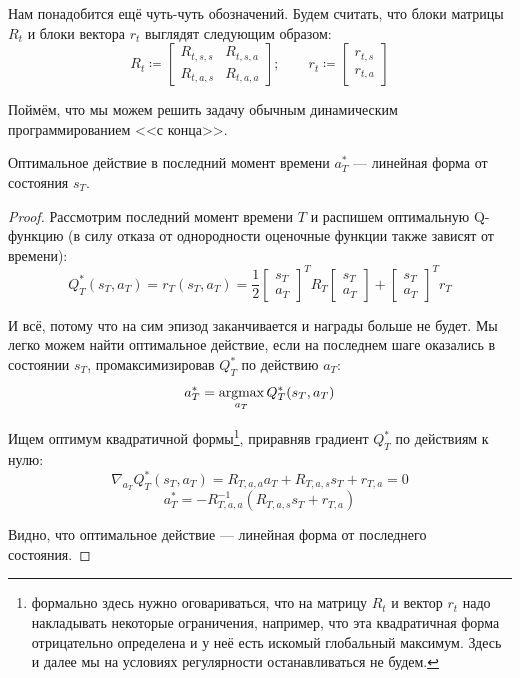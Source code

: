 Нам понадобится ещё чуть-чуть обозначений. Будем считать, что блоки матрицы $R_t$ и блоки вектора $r_t$ выглядят следующим образом:
$$R_t \coloneqq \begin{bmatrix} R_{t, s, s} & R_{t, s, a} \\ R_{t, a, s} & R_{t, a, a} \end{bmatrix}; \qquad r_t \coloneqq \begin{bmatrix} r_{t, s} \\ r_{t, a} \end{bmatrix}$$

Поймём, что мы можем решить задачу обычным динамическим программированием <<с конца>>.
\begin{theorem}
Оптимальное действие в последний момент времени $a_T^*$ --- линейная форма от состояния $s_T$.
\begin{proof}
Рассмотрим последний момент времени $T$ и распишем оптимальную Q-функцию (в силу отказа от однородности оценочные функции также зависят от времени):
$$Q^*_T(s_T, a_T) = r_T(s_T, a_T) = \frac{1}{2} \begin{bmatrix} s_T \\ a_T \end{bmatrix}^T R_T \begin{bmatrix} s_T \\ a_T \end{bmatrix} + \begin{bmatrix} s_T \\ a_T \end{bmatrix}^T r_T$$

И всё, потому что на сим эпизод заканчивается и награды больше не будет. Мы легко можем найти оптимальное действие, если на последнем шаге оказались в состоянии $s_T$, промаксимизировав $Q^*_T$ по действию $a_T$:
$$a^*_T = \mathop{\mathrm{argmax}}_{a_T} Q^*_T(s_T, a_T)$$

Ищем оптимум квадратичной формы\footnote{формально здесь нужно оговариваться, что на матрицу $R_t$ и вектор $r_t$ надо накладывать некоторые ограничения, например, что эта квадратичная форма отрицательно определена и у неё есть искомый глобальный максимум. Здесь и далее мы на условиях регулярности останавливаться не будем.}, приравняв градиент $Q^*_T$ по действиям к нулю:
$$\nabla_{a_T} Q^*_T(s_T, a_T) = R_{T, a, a} a_T + R_{T, a, s}s_T + r_{T, a} = 0$$
$$a^*_T = -R_{T, a, a}^{-1} \left( R_{T, a, s}s_T + r_{T, a} \right)$$

Видно, что оптимальное действие --- линейная форма от последнего состояния. 
\end{proof}
\end{theorem}

